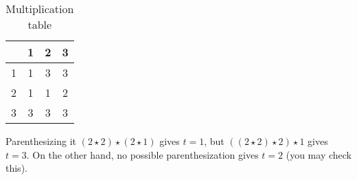 \documentclass[11pt]{article}
\begin{document}
\begin{table}[ht]
\caption{Multiplication table} %
\centering  %
\begin{tabular}{c | c c c} %
 & 1 & 2 & 3 \\ [0.5ex] %
\hline                  %
1 & 1 & 3 & 3  \\ %
2 & 1 & 1 & 2  \\
3 & 3 & 3 & 3  \\
\end{tabular}
\end{table}

Parenthesizing it $(2\star 2)\star (2\star 1)$ gives $t=1$, but $((2\star 2)\star 2)\star 1$ gives $t=3$. On the other hand, no possible parenthesization gives $t=2$ (you may check this).
\end{document}
